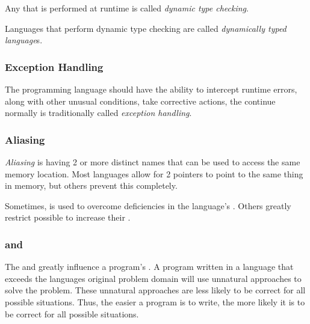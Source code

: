 \begin{definition}\label{def:Dynamic_Type_Checking}
  Any  that is performed at runtime is called \emph{dynamic type checking}.

  Languages that perform dynamic type checking are called \emph{dynamically typed language}s.
\end{definition}

\subsubsection{Exception Handling}\label{subsubsec:Exception_Handling}
The programming language should have the ability to intercept runtime errors, along with other unusual conditions, take corrective actions, the continue normally is traditionally called \emph{exception handling}.

\subsubsection{Aliasing}\label{subsubsec:Aliasing}
\begin{definition}[Aliasing]\label{def:Aliasing}
  \emph{Aliasing} is having 2 or more distinct names that can be used to access the same memory location.
  Most languages allow for 2 pointers to point to the same thing in memory, but others prevent this completely.
\end{definition}

Sometimes,  is used to overcome deficiencies in the language's .
Others greatly restrict possible  to increase their .

\subsubsection{ and }\label{subsubsec:Reliable_Readability_and_Writability}
The  and  greatly influence a program's .
A program written in a language that exceeds the languages original problem domain will use unnatural approaches to solve the problem.
These unnatural approaches are less likely to be correct for all possible situations.
Thus, the easier a program is to write, the more likely it is to be correct for all possible situations.


